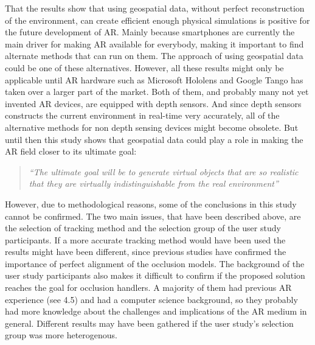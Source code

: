 That the results show that using geospatial data, without perfect reconstruction of the environment, can create efficient enough physical simulations is positive for the future development of AR. Mainly because smartphones are currently the main driver for making AR available for everybody, making it important to find alternate methods that can run on them. The approach of using geospatial data could be one of these alternatives. However, all these results might only be applicable until AR hardware such as Microsoft Hololens and Google Tango has taken over a larger part of the market. Both of them, and probably many not yet invented AR devices, are equipped with depth sensors. And since depth sensors constructs the current environment in real-time very accurately, all of the alternative methods for non depth sensing devices might become obsolete. But until then this study shows that geospatial data could play a role in making the AR field closer to its ultimate goal: 

\begin{quote}
\textit{``The ultimate goal will be to generate virtual objects that are so realistic that they are virtually indistinguishable from the real environment''} \cite{azuma1997survey}
\end{quote} 

However, due to methodological reasons, some of the conclusions in this study cannot be confirmed. The two main issues, that have been described above, are the selection of tracking method and the selection group of the user study participants. If a more accurate tracking method would have been used the results might have been different, since previous studies have confirmed the importance of perfect alignment of the occlusion models. The background of the user study participants also makes it difficult to confirm if the proposed solution reaches the goal for occlusion handlers. A majority of them had previous AR experience (see 4.5) and had a computer science background, so they probably had more knowledge about the challenges and implications of the AR medium in general. Different results may have been gathered if the user study's selection group was more heterogenous.

